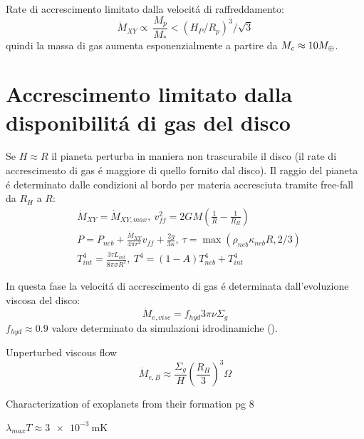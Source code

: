 \begin{reworking}
	
	\begin{workout}
		Rate di accrescimento limitato dalla velocit\'a di raffreddamento:
		\begin{equation}
		\dot{M}_{XY}\propto\ \frac{M_p}{M_*}<(H_P/R_p)^3/\sqrt{3}
		\end{equation}
		quindi la massa di gas aumenta esponenzialmente a partire da $M_c\approx10M_{\oplus}{}$.
	\end{workout}
	
	\section{Accrescimento limitato dalla disponibilit\'a di gas del disco}
	
	Se $H\approx R$ il pianeta perturba in maniera non trascurabile il disco (il rate di accrescimento di gas \'e maggiore di quello fornito dal disco). Il raggio del pianeta \'e determinato dalle condizioni al bordo per materia accresciuta tramite free-fall da $R_H$ a $R$:
	\begin{align}
	&\dot{M}_{XY}=\dot{M}_{XY,max},\ v_{ff}^2=2GM(\frac{1}{R}-\frac{1}{R_H})\\
	&P=P_{neb}+\frac{\dot{M}_{XY}}{4\pi r^2}v_{ff}+\frac{2g}{3\kappa},\ \tau=\max{(\rho_{neb}\kappa_{neb}R,2/3)}\\
	&T_{int}^4=\frac{3\tau L_{int}}{8\pi\sigma R^2},\ T^4=(1-A)T_{neb}^4+T_{int}^4
	\end{align}
	
	In questa fase la velocit\'a di accrescimento di gas \'e determinata dall'evoluzione viscosa del disco:
	\begin{equation}
	\dot{M}_{e,visc}=f_{hyd}3\pi\nu\Sigma_g
	\end{equation}
	$f_{hyd}\approx0.9$ valore determinato da simulazioni idrodinamiche (\cite{lubow1999disk}).
	
	\begin{workout}
		Unperturbed viscous flow
		\begin{equation}
		\dot{M}_{e,B}\approx\frac{\Sigma_g}{H}(\frac{R_H}{3})^3\Omega
		\end{equation}
	\end{workout}
	
	\begin{workout}
		Characterization of exoplanets from their formation pg 8
	\end{workout}
	
	\begin{workout}
		$\lambda_{max}T\approx \SI{3e-3}{\meter\kelvin}$
	\end{workout}
	

\end{reworking}

